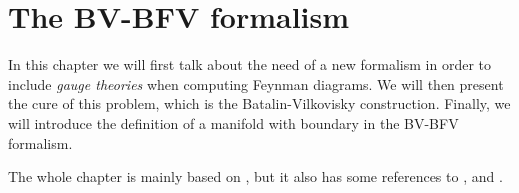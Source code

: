 \chapter{The BV-BFV formalism}
\label{chap:BV-BFV}

In this chapter we will first talk about the need of a new formalism in order to include \emph{gauge theories} when computing Feynman diagrams.
We will then present the cure of this problem, which is the Batalin-Vilkovisky construction.
Finally, we will introduce the definition of a manifold with boundary in the BV-BFV formalism.

The whole chapter is mainly based on \cite{Nima}, but it also has some references to \cite{Musio},\cite{Mnfd_boundaries} and \cite{Lectures}.



